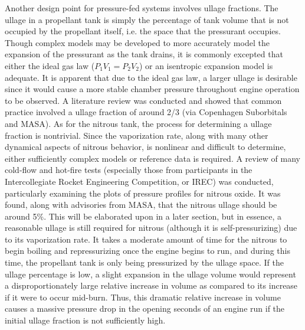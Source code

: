 \documentclass[9pt]{article} %
\numberwithin{equation}{section} %
\begin{document}
\hspace{\parindent} Another design point for pressure-fed systems involves ullage fractions. The ullage in a propellant tank is simply the percentage of tank volume that is not occupied by the propellant itself, i.e. the space that the pressurant occupies. Though complex models may be developed to more accurately model the expansion of the pressurant as the tank drains, it is commonly excepted that either the ideal gas law ($P_{1}V_{1} = P_{2}V_{2}$) or an isentropic expansion model is adequate. It is apparent that due to the ideal gas law, a larger ullage is desirable since it would cause a more stable chamber pressure throughout engine operation to be observed. A literature review was conducted and showed that common practice involved a ullage fraction of around 2/3 (via Copenhagen Suborbitals and MASA). As for the nitrous tank, the process for determining a ullage fraction is nontrivial. Since the vaporization rate, along with many other dynamical aspects of nitrous behavior, is nonlinear and difficult to determine, either sufficiently complex models or reference data is required. A review of many cold-flow and hot-fire tests (especially those from participants in the Intercollegiate Rocket Engineering Competition, or IREC) was conducted, particularly examining the plots of pressure profiles for nitrous oxide. It was found, along with advisories from MASA, that the nitrous ullage should be around 5\%. This will be elaborated upon in a later section, but in essence, a reasonable ullage is still required for nitrous (although it is self-pressurizing) due to its vaporization rate. It takes a moderate amount of time for the nitrous to begin boiling and repressurizing once the engine begins to run, and during this time, the propellant tank is only being pressurized by the ullage space. If the ullage percentage is low, a slight expansion in the ullage volume would represent a disproportionately large relative increase in volume as compared to its increase if it were to occur mid-burn. Thus, this dramatic relative increase in volume causes a massive pressure drop in the opening seconds of an engine run if the initial ullage fraction is not sufficiently high.
\end{document}
